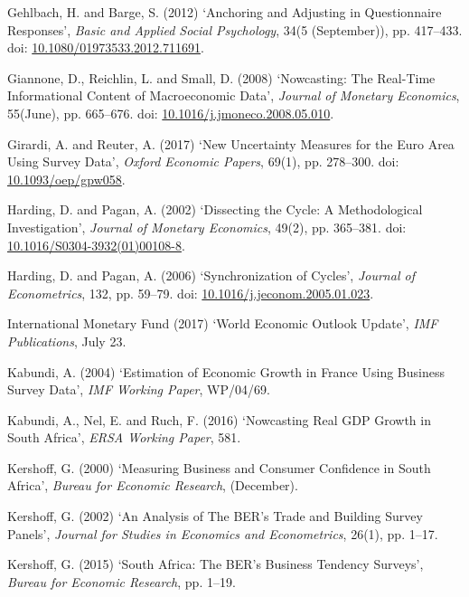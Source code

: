 \documentclass[11pt,]{article}
\begin{document}
\hypertarget{ref-Gehlbach2012}{}
Gehlbach, H. and Barge, S. (2012) `Anchoring and Adjusting in
Questionnaire Responses', \emph{Basic and Applied Social Psychology},
34(5 (September)), pp. 417--433. doi:
\href{https://doi.org/10.1080/01973533.2012.711691}{10.1080/01973533.2012.711691}.

\hypertarget{ref-Giannone2008}{}
Giannone, D., Reichlin, L. and Small, D. (2008) `Nowcasting: The
Real-Time Informational Content of Macroeconomic Data', \emph{Journal of
Monetary Economics}, 55(June), pp. 665--676. doi:
\href{https://doi.org/10.1016/j.jmoneco.2008.05.010}{10.1016/j.jmoneco.2008.05.010}.

\hypertarget{ref-Girardi2017}{}
Girardi, A. and Reuter, A. (2017) `New Uncertainty Measures for the Euro
Area Using Survey Data', \emph{Oxford Economic Papers}, 69(1), pp.
278--300. doi:
\href{https://doi.org/10.1093/oep/gpw058}{10.1093/oep/gpw058}.

\hypertarget{ref-Harding2002}{}
Harding, D. and Pagan, A. (2002) `Dissecting the Cycle: A Methodological
Investigation', \emph{Journal of Monetary Economics}, 49(2), pp.
365--381. doi:
\href{https://doi.org/10.1016/S0304-3932(01)00108-8}{10.1016/S0304-3932(01)00108-8}.

\hypertarget{ref-Harding2006}{}
Harding, D. and Pagan, A. (2006) `Synchronization of Cycles',
\emph{Journal of Econometrics}, 132, pp. 59--79. doi:
\href{https://doi.org/10.1016/j.jeconom.2005.01.023}{10.1016/j.jeconom.2005.01.023}.

\hypertarget{ref-IMF2017}{}
International Monetary Fund (2017) `World Economic Outlook Update',
\emph{IMF Publications}, July 23.

\hypertarget{ref-Kabundi2004}{}
Kabundi, A. (2004) `Estimation of Economic Growth in France Using
Business Survey Data', \emph{IMF Working Paper}, WP/04/69.

\hypertarget{ref-Kabundi2016}{}
Kabundi, A., Nel, E. and Ruch, F. (2016) `Nowcasting Real GDP Growth in
South Africa', \emph{ERSA Working Paper}, 581.

\hypertarget{ref-Kershoff2000}{}
Kershoff, G. (2000) `Measuring Business and Consumer Confidence in South
Africa', \emph{Bureau for Economic Research}, (December).

\hypertarget{ref-Kershoff2002}{}
Kershoff, G. (2002) `An Analysis of The BER's Trade and Building Survey
Panels', \emph{Journal for Studies in Economics and Econometrics},
26(1), pp. 1--17.

\hypertarget{ref-Kershoff2015}{}
Kershoff, G. (2015) `South Africa: The BER's Business Tendency Surveys',
\emph{Bureau for Economic Research}, pp. 1--19.
\end{document}
